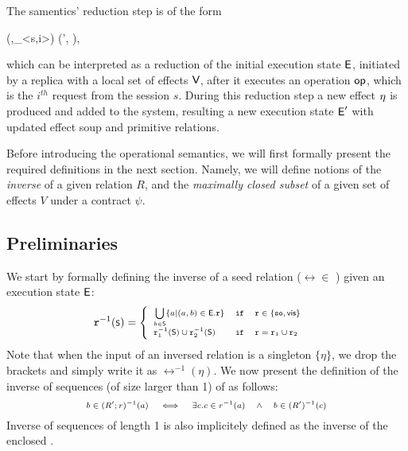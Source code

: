 The samentics' reduction step is of the form
\begin{smathpar}
\scriptsize
(\E,\op_{<s,i>}) \;\xrightarrow{\V}\; (\E', \eff),
\end{smathpar}
which can be interpreted as a reduction of the initial execution state
${\normalfont \textsf{E}}$, initiated by a replica with a local 
set of effects ${\normalfont \textsf{V}}$, after it executes an operation
${\normalfont \textsf{op}}$, which is the $i^{th}$ request from the session $s$. 
During this reduction step a new effect $\eta$ is produced and added to
the system, resulting a new execution state ${\normalfont \textsf{E}}'$ with updated effect
soup and primitive relations.

Before introducing the operational semantics, we will first formally
present the required definitions in the next section. Namely, we will define  
notions of the \emph{inverse} of a given relation $R$, and the \emph{maximally
closed subset} of a given set of effects $V$ under a contract $\psi$. 




\subsection{Preliminaries}
\label{subsec:prelim}
We start by formally defining the inverse of a seed relation ($\rel \in$
\seedS{}) given an 
execution state ${\normalfont \textsf{E}}$:
\begin{equation}
\label{eq:r_inv}
\scriptsize
\mathtt{r}^{-1}({\normalfont \textsf{S}}) = 
\begin{cases}
\begin{array}{lcl}
\bigcup\limits_{b\in {\normalfont \textsf{S}}}\{a|(a,b) \in {\normalfont \textsf{E}}.\mathtt{r} \} & \mathtt {if}
&\mathtt{r}\in\{{\normalfont \texttt{so}},{\normalfont \textsf{vis}}\}\ \\ 
\mathtt{r}_1^{-1}({\normalfont \textsf{S}})\cup \mathtt{r}_2^{-1}({\normalfont \textsf{S}}) & \mathtt {if} & \mathtt{r}=\mathtt{r}_1\cup \mathtt{r}_2
\end{array}
\end{cases}
\end{equation}
Note that when the input of an inversed relation is a singleton
$\{\eta\}$, we drop the brackets and simply write it as
$\rel^{-1}(\eta)$.
We now present the definition of the inverse of 
sequences (of size larger than 1) of \seedS{} as follows:
\begin{equation}
\label{eq:seq_inv}
\scriptsize
\begin{array}{lllll}
b \in  (R';r)^{-1}(a) & \iff & \exists c. c \in r^{-1}(a)
& \wedge & b \in (R')^{-1}(c) 
\end{array}
\end{equation}
Inverse of sequences of length 1 is also implicitely defined as the
inverse of the enclosed \seedS{}.

